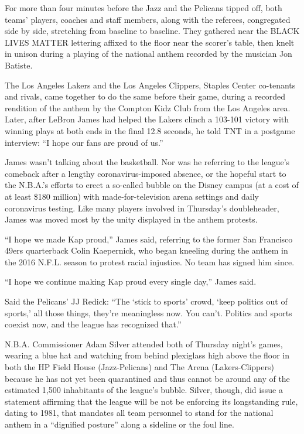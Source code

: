 For more than four minutes before the Jazz and the Pelicans tipped off,
both teams' players, coaches and staff members, along with the referees,
congregated side by side, stretching from baseline to baseline. They
gathered near the BLACK LIVES MATTER lettering affixed to the floor near
the scorer's table, then knelt in unison during a playing of the
national anthem recorded by the musician Jon Batiste.

The Los Angeles Lakers and the Los Angeles Clippers, Staples Center
co-tenants and rivals, came together to do the same before their game,
during a recorded rendition of the anthem by the Compton Kidz Club from
the Los Angeles area. Later, after LeBron James had helped the Lakers
clinch a 103-101 victory with winning plays at both ends in the final
12.8 seconds, he told TNT in a postgame interview: ``I hope our fans are
proud of us.''

James wasn't talking about the basketball. Nor was he referring to the
league's comeback after a lengthy coronavirus-imposed absence, or the
hopeful start to the N.B.A.'s efforts to erect a so-called bubble on the
Disney campus (at a cost of at least \$180 million) with
made-for-television arena settings and daily coronavirus testing. Like
many players involved in Thursday's doubleheader, James was moved most
by the unity displayed in the anthem protests.

``I hope we made Kap proud,'' James said, referring to the former San
Francisco 49ers quarterback Colin Kaepernick, who began kneeling during
the anthem in the 2016 N.F.L. season to protest racial injustice. No
team has signed him since.

``I hope we continue making Kap proud every single day,'' James said.

Said the Pelicans' JJ Redick: ``The `stick to sports' crowd, `keep
politics out of sports,' all those things, they're meaningless now. You
can't. Politics and sports coexist now, and the league has recognized
that.''

N.B.A. Commissioner Adam Silver attended both of Thursday night's games,
wearing a blue hat and watching from behind plexiglass high above the
floor in both the HP Field House (Jazz-Pelicans) and The Arena
(Lakers-Clippers) because he has not yet been quarantined and thus
cannot be around any of the estimated 1,500 inhabitants of the league's
bubble. Silver, though, did issue a statement affirming that the league
will be not be enforcing its longstanding rule, dating to 1981, that
mandates all team personnel to stand for the national anthem in a
``dignified posture'' along a sideline or the foul line.

